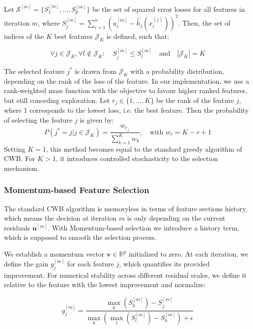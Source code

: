 \documentclass[fontsize=12 pt]{scrartcl}
\begin{document}
Let $\mathcal{S}^{[m]} = \{S_1^{[m]}, \dots, S_p^{[m]}\}$ be the set of squared error losses for all features in iteration $m$, where $S_j^{[m]} = \sum_{i=1}^n (u_i^{[m]} - \hat{h}_j(x_i^{(j)}))^2$. Then, the set of indices of the $K$ best features $\mathcal{J}_K$ is defined, such that:

\begin{equation}
    \forall j \in \mathcal{J}_K, \forall l \notin \mathcal{J}_K: \quad S_j^{[m]} \le S_l^{[m]} \quad \text{and} \quad |\mathcal{J}_K| = K
\end{equation}

The selected feature $j^*$ is drawn from $\mathcal{J}_K$ with a probability distribution, depending on the rank of the loss of the feature. In our implementation, we use a rank-weighted mass function with the objective to favour higher ranked features, but still conceding exploration. Let $r_j \in \{1, \dots, K\}$ be the rank of the feature $j$, where 1 corresponds to the lowest loss, i.e. the best feature. Then the probability of selecting the feature $j$ is given by:
\begin{equation}
    P(j^* = j | j \in \mathcal{J}_K) = \frac{w_{r_j}}{\sum_{k=1}^K w_k}, \quad \text{with } w_r = K - r + 1
\end{equation}
Setting $K=1$, this method becomes equal to the standard greedy algorithm of CWB. For $K > 1$, it introduces controlled stochasticity to the selection mechanism.

\subsubsection{Momentum-based Feature Selection}

The standard CWB algorithm is memoryless in terms of feature sections history, which means the decision at iteration $m$ is only depending on the current residuals $\mathbf{u}^{[m]}$. With Momentum-based selection we introduce a history term, which is supposed to smooth the selection process. 

We establish a momentum vector $\mathbf{v} \in \mathbb{R}^p$ initialized to zero. At each iteration, we define the gain $g_j^{[m]}$ for each feature $j$, which quantifies its provided improvement. For numerical stability across different residual scales, we define it relative to the feature with the lowest improvement and normalize:

\begin{equation}
    g_j^{[m]} = \frac{\max_k (S_k^{[m]}) - S_j^{[m]}}{\max_k (\max_l (S_l^{[m]}) - S_k^{[m]}) + \epsilon}
\end{equation}
\end{document}
